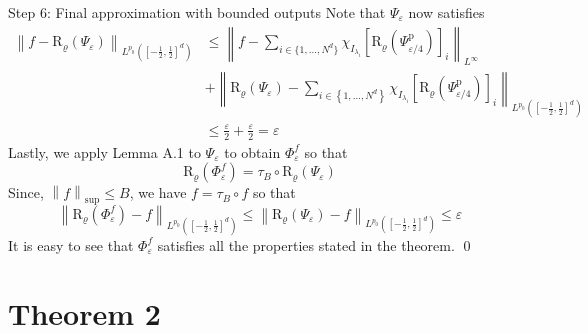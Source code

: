 \documentclass{if-beamer}
\newcommand{\norm}[2]{\left\lVert#1\right\rVert_{#2}}
\begin{document}
\begin{frame}{Step 6: Final approximation with bounded outputs}
    Note that $\Psi_{\varepsilon}$ now satisfies 
    {\small
    \begin{align*}
        \left\|f - \mathrm{R}_{\varrho}\left(\Psi_{\varepsilon}\right)\right\|_{L^{p_{0}}([-\frac{1}{2}, \frac{1}{2}]^d)} &\leq
         \norm{f-\sum_{i \in\{1, \ldots, N^{d}\}} \chi_{I_{\lambda_{i}}}\left[\mathrm{R}_{\varrho}\left(\Psi_{\varepsilon / 4}^{\mathrm{p}}\right)\right]_{i}}{L^{\infty}}\\
         &+ \left\|\mathrm{R}_{\varrho}\left(\Psi_{\varepsilon}\right)-\sum_{i \in\left\{1, \ldots, N^{d}\right\}} \chi_{I_{\lambda_{i}}}\left[\mathrm{R}_{\varrho}\left(\Psi_{\varepsilon / 4}^{\mathrm{p}}\right)\right]_{i}\right\|_{L^{p_{0}}([-\frac{1}{2}, \frac{1}{2}]^d)} \\
         &\leq \frac{\varepsilon}{2} + \frac{\varepsilon}{2} = \varepsilon
    \end{align*}
    }%
    Lastly, we apply Lemma A.1 to $\Psi_{\varepsilon}$ to obtain $\Phi_{\varepsilon}^f$ so that $$\mathrm{R}_{\varrho}(\Phi_{\varepsilon}^f) = \tau_B \circ \mathrm{R}_{\varrho}(\Psi_{\varepsilon}) $$
    Since, $\norm{f}{\sup} \leq B$, we have $f = \tau_B \circ f$ so that $$\norm{\mathrm{R}_{\varrho}(\Phi_{\varepsilon}^f) - f}{L^{p_0}([-\frac{1}{2}, \frac{1}{2}]^d)} \leq  \norm{\mathrm{R}_{\varrho}(\Psi_{\varepsilon}) - f}{L^{p_0}([-\frac{1}{2}, \frac{1}{2}]^d)} \leq \varepsilon$$
    It is easy to see that $\Phi_{\varepsilon}^f$ satisfies all the properties stated in the theorem. \qed
\end{frame}

\section{Theorem 2}
\end{document}
